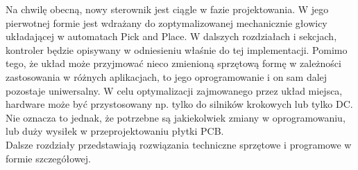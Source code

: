Na chwilę obecną, nowy sterownik jest ciągle w fazie projektowania. W jego pierwotnej formie jest wdrażany do zoptymalizowanej mechanicznie głowicy układającej w automatach Pick and Place. W dalszych rozdziałach i sekcjach, kontroler będzie opisywany w odniesieniu właśnie do tej implementacji. Pomimo tego, że układ może przyjmować nieco zmienioną sprzętową formę w zależności zastosowania w różnych aplikacjach, to jego oprogramowanie i on sam dalej pozostaje uniwersalny. W celu optymalizacji zajmowanego przez układ miejsca, hardware może być przystosowany np. tylko do silników krokowych lub tylko DC. Nie oznacza to jednak, że potrzebne są jakiekolwiek zmiany w oprogramowaniu, lub duży wysiłek w przeprojektowaniu płytki PCB. \\ 

Dalsze rozdziały przedstawiają rozwiązania techniczne sprzętowe i programowe w formie szczegółowej.

\clearpage



